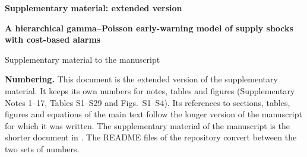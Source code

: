 \documentclass[10pt,a4paper]{article}
\begin{document}
{\large\bfseries Supplementary material: extended version}

{\bfseries A hierarchical gamma–Poisson early-warning model of supply shocks with cost-based alarms}

Supplementary material to the manuscript

\textbf{Numbering.} This document is the extended version of the supplementary material. It keeps its own numbers for notes, tables and figures (Supplementary Notes 1--17, Tables S1--S29 and Figs.~S1--S4). Its references to sections, tables, figures and equations of the main text follow the longer version of the manuscript for which it was written. The supplementary material of the manuscript is the shorter document in . The README files of the repository convert between the two sets of numbers.
\end{document}
